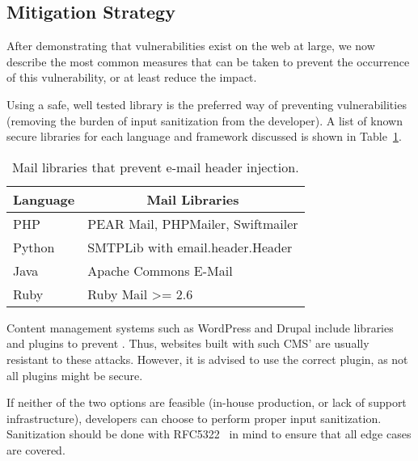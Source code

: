 \subsection{Mitigation Strategy}
\label{disc:mitigation}
After demonstrating that \ehi vulnerabilities exist on the web at large, we now describe the most common measures that can be taken to prevent the occurrence of this vulnerability, or at least reduce the impact.

Using a safe, well tested \email library is the preferred way of
preventing \ehi vulnerabilities (removing the burden of input
sanitization from the developer). A list of known secure libraries for
each language and framework discussed is shown in
Table~\ref{tab:maillib}.
	\begin{table}[tbp]
		\centering
		\scriptsize
		\begin{tabular}{|l|l|}
			\hline
			\multicolumn{1}{|c|}{\textbf{Language}} &
			\multicolumn{1}{c|}{\textbf{Mail Libraries}} \\
			\hline
			PHP & {{PEAR Mail\cite{Hagenbuch2016}, PHPMailer\cite{PHPMailer2016}, Swiftmailer\cite{SwiftMailer2016}}}\\
			\hline
			Python & SMTPLib with email.header.Header\\
			\hline
			Java & Apache Commons E-Mail\cite{ACE2016}\\
			\hline
			Ruby & Ruby Mail \textgreater{}= 2.6\cite{RubyMailGem2016}\\
			\hline
		\end{tabular}
		\caption[]{Mail libraries that prevent e-mail header
          injection.}
        \vspace{-5ex}        
		\label{tab:maillib}
	\end{table}

Content management systems such as WordPress and Drupal include
libraries and plugins to prevent \ehi. Thus, websites built with such
CMS' are usually resistant to these attacks. However, it is advised to
use the correct \email plugin, as not all plugins might be secure.

If neither of the two options are feasible (in-house
production, or lack of support infrastructure), developers can
choose to perform proper input sanitization. Sanitization should be
done with RFC5322~\cite{rfc5322} in mind to
ensure that all edge cases are covered.
	

